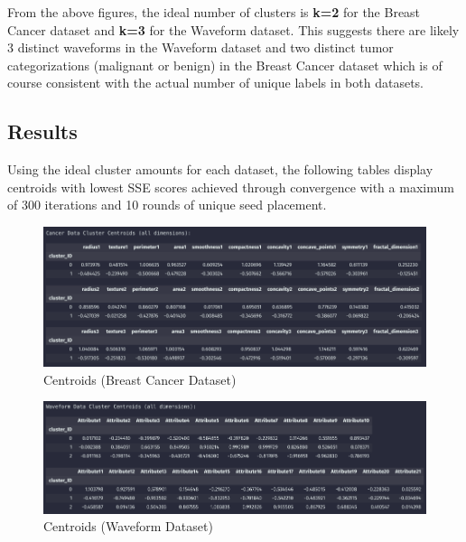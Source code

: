 \documentclass{article}
\begin{document}
From the above figures, the ideal number of clusters is \textbf{k=2} for the Breast Cancer dataset and \textbf{k=3} for the Waveform dataset. This
suggests there are likely 3 distinct waveforms in the Waveform dataset and two distinct tumor categorizations (malignant or benign)
in the Breast Cancer dataset which is of course consistent with the actual number of unique labels in both datasets.

\subsection{Results}

Using the ideal cluster amounts for each dataset, the following tables display centroids with lowest SSE scores achieved through
convergence with a maximum of 300 iterations and 10 rounds of unique seed placement.
\begin{figure}[H]
    \centering
    \includegraphics[width=\textwidth]{cancer_centroids.png}
    \caption{Centroids (Breast Cancer Dataset)}
\end{figure}
\begin{figure}[H]
    \centering
    \includegraphics[width=\textwidth]{waveform_centroids.png}
    \caption{Centroids (Waveform Dataset)}
\end{figure}
\end{document}
